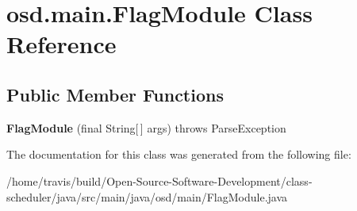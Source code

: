 \hypertarget{classosd_1_1main_1_1_flag_module}{\section{osd.\-main.\-Flag\-Module Class Reference}
\label{classosd_1_1main_1_1_flag_module}
}
\subsection*{Public Member Functions}
\begin{DoxyCompactItemize}
\item 
\hypertarget{classosd_1_1main_1_1_flag_module_a131cd0883177a835b1766f4d4655bb87}{{\bfseries Flag\-Module} (final String\mbox{[}$\,$\mbox{]} args)  throws Parse\-Exception }\label{classosd_1_1main_1_1_flag_module_a131cd0883177a835b1766f4d4655bb87}

\end{DoxyCompactItemize}


The documentation for this class was generated from the following file\-:\begin{DoxyCompactItemize}
\item 
/home/travis/build/\-Open-\/\-Source-\/\-Software-\/\-Development/class-\/scheduler/java/src/main/java/osd/main/Flag\-Module.\-java\end{DoxyCompactItemize}
